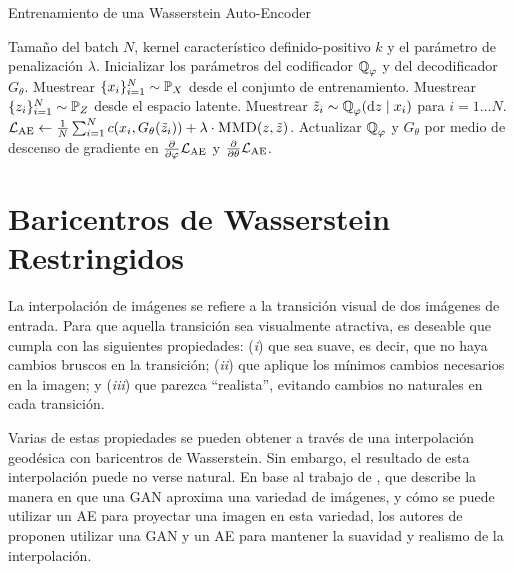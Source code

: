 \begin{algorithm}[H]

    \caption{Entrenamiento de una Wasserstein Auto-Encoder \cite{tolstikhin2017wasserstein}}\label{alg:WAE}

    \begin{algorithmic}[1]
        \Require Tamaño del batch $N$, kernel característico definido-positivo $k$ y el parámetro de penalización $\lambda$.
        \State{}
        \EndFunction
        \State Inicializar los parámetros del codificador $\ProbQ_\varphi$ y del decodificador $G_\theta$.
        \State Muestrear $\{x_i\}_{i=1}^{N} \sim \Prob_X$ desde el conjunto de entrenamiento.
        \State Muestrear $\{z_i\}_{i=1}^{N} \sim \Prob_Z$ desde el espacio latente.
        \State Muestrear $\tilde z_i \sim \ProbQ_\varphi(\dd z \mid x_i)$ para $i=1\dots N$.
        \State $\cL_{\mathrm{AE}} \gets \frac{1}{N}\sum_{i=1}^{N} c(x_i, G_\theta(\tilde z_i)) + \lambda \cdot \Call{MMD}{z, \tilde z}$.
        \State Actualizar $\ProbQ_\varphi$ y $G_\theta$ por medio de descenso de gradiente en $\pdv{\varphi} \cL_{\mathrm{AE}}$ y $\pdv{\theta} \mathcal{L}_{\mathrm{AE}}$.
        \EndWhile
    \end{algorithmic}
\end{algorithm}


\section{Baricentros de Wasserstein Restringidos}\label{sec:app-bar-wass-Proyectados}  %

La interpolación de imágenes se refiere a la transición visual de dos imágenes de entrada. Para que aquella transición sea visualmente atractiva, es deseable que cumpla con las siguientes propiedades: (\textit{i}) que sea suave, es decir, que no haya cambios bruscos en la transición; (\textit{ii}) que aplique los mínimos cambios necesarios en la imagen; y (\textit{iii}) que parezca ``realista'', evitando cambios no naturales en cada transición.

Varias de estas propiedades se pueden obtener a través de una interpolación geodésica con baricentros de Wasserstein. Sin embargo, el resultado de esta interpolación puede no verse natural.
En base al trabajo de \cite{zhu2016generative}, que describe la manera en que una GAN aproxima una variedad de imágenes, y cómo se puede utilizar un AE para proyectar una imagen en esta variedad, los autores de \cite{simon2020barycenters} proponen utilizar una GAN y un AE para mantener la suavidad y realismo de la interpolación.


